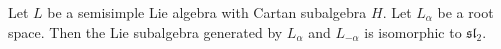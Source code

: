 Let $L$ be a semisimple Lie algebra with Cartan subalgebra $H$. Let $L_\alpha$
be a root space. Then the Lie subalgebra generated by $L_\alpha$ and
$L_{-\alpha}$ is isomorphic to $\mathfrak{sl}_2$.
